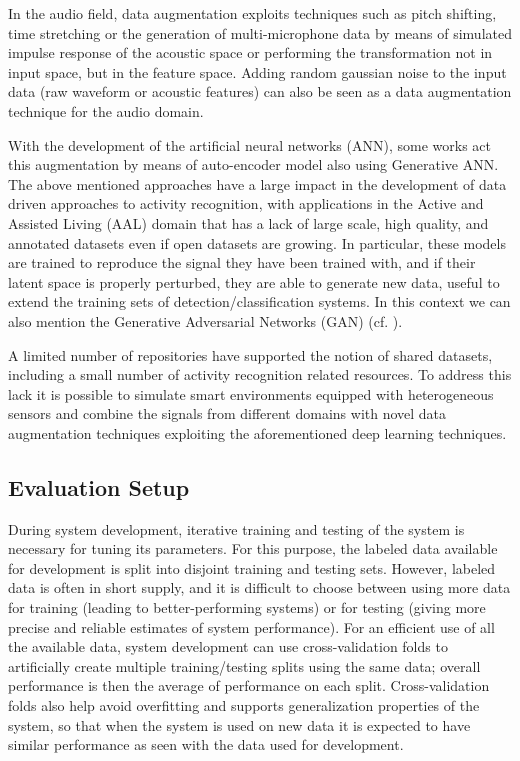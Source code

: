 In the audio field, data augmentation exploits techniques such as pitch shifting, time stretching or the generation of multi-microphone data by means of simulated impulse response of the acoustic space or performing the transformation not in input space, but in the feature space. Adding random gaussian noise to the input data (raw waveform or acoustic features) can also be seen as a data augmentation technique for the audio domain.

With the development of the artificial neural networks (ANN), some works act this augmentation by means of auto-encoder model also using Generative ANN. The above mentioned approaches have a large impact in the development of data driven approaches to activity recognition, with applications in the Active and Assisted Living (AAL) domain that has a lack of large scale, high quality, and annotated datasets even if open datasets are growing. In particular, these models are trained to reproduce the signal they have been trained with, and if their latent space is properly perturbed, they are able to generate new data, useful to extend the training sets of detection/classification systems. In this context we can also mention the Generative Adversarial Networks (GAN) (cf. ). 

A limited number of repositories have supported the notion of shared datasets, including a small number of activity recognition related resources. To address this lack it is possible to simulate smart environments equipped with heterogeneous sensors and combine the signals from different domains with novel data augmentation techniques exploiting the aforementioned deep learning techniques.

\subsection{Evaluation Setup}
During system development, iterative training and testing of the system is necessary
for tuning its parameters. For this purpose, the labeled data available for development is split into disjoint training and testing sets. However, labeled data is often in short supply, and it is difficult to choose between using more data for training (leading to better-performing systems) or for testing (giving more precise and
reliable estimates of system performance). For an efficient use of all the available
data, system development can use cross-validation folds to artificially
create multiple training/testing splits using the same data; overall performance is
then the average of performance on each split. Cross-validation folds also help avoid
overfitting and supports generalization properties of the system, so that when the
system is used on new data it is expected to have similar performance as seen with
the data used for development.

